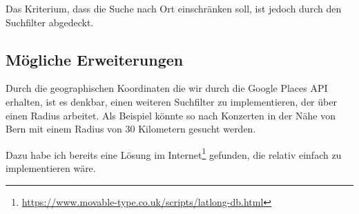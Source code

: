 Das Kriterium, dass die Suche nach Ort einschränken soll, ist jedoch durch den
Suchfilter abgedeckt.

\clearpage
\subsection{Mögliche Erweiterungen}

Durch die geographischen Koordinaten die wir durch die Google Places API erhalten,
ist es denkbar, einen weiteren Suchfilter zu implementieren, der über einen Radius
arbeitet. Als Beispiel könnte so nach Konzerten in der Nähe von Bern mit einem
Radius von 30 Kilometern gesucht werden.

Dazu habe ich bereits eine Lösung im Internet\footnote{\url{https://www.movable-type.co.uk/scripts/latlong-db.html}}
gefunden, die relativ einfach zu implementieren wäre.
